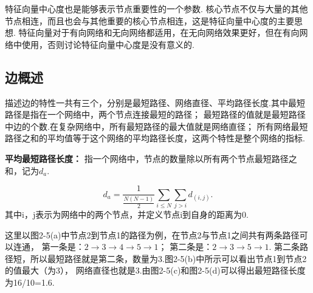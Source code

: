 \documentclass[bachelor,adobefonts]{jnuthesis}
\begin{document}
特征向量中心度\cite{spizzirri2011justification}也是能够表示节点重要性的一个参数.
核心节点不仅与大量的其他节点相连，而且也会与其他重要的核心节点相连，这是特征向量中心度的主要思想.
特征向量对于有向网络和无向网络都适用，在无向网络效果更好，但在有向网络中使用，否则讨论特征向量中心度是没有意义的.





\subsection{边概述}
描述边的特性一共有三个，分别是最短路径、网络直径、平均路径长度.其中最短路径是指在一个网络中，两个节点连接最短的路径；
最短路径的值就是最短路径中边的个数.在复杂网络中，所有最短路径的最大值就是网络直径；
所有网络最短路径之和的平均值等于这个网络的平均路径长度，这两个特性是整个网络的指标.


\begin{definition}  
  \textbf{平均最短路径长度：} 指一个网络中，节点的数量除以所有两个节点最短路径之和，记为$d_a$.
\end{definition} 
\begin{equation}
    d_a = \frac{1}{\frac{N(N-1)}{2}}\sum_{i \leq N}\sum_{j > i}d_{(i,j)}.
\end{equation}
其中i，j表示为网络中的两个节点，并定义节点i到自身的距离为0.




这里以图2-5(a)中节点2到节点1的路径为例，在节点2与节点1之间共有两条路径可以连通，
第一条是：$2 \rightarrow 3 \rightarrow 4 \rightarrow 5 \rightarrow 1$；
第二条是：$2 \rightarrow 3  \rightarrow 5 \rightarrow 1$.
第二条路径短，所以最短路径就是第二条，数量为3.图2-5(b)中所示可以看出节点1到节点2的值最大（为3），
网络直径也就是3.由图2-5(c)和图2-5(d)可以得出最短路径长度为16/10=1.6.
\end{document}
